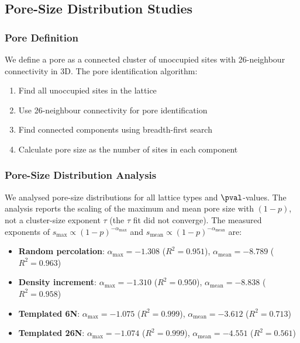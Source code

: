 \subsection{Pore-Size Distribution Studies}

\subsubsection{Pore Definition}
We define a pore as a connected cluster of unoccupied sites with 26-neighbour connectivity in 3D. The pore identification algorithm:

\begin{enumerate}
    \item Find all unoccupied sites in the lattice
    \item Use 26-neighbour connectivity for pore identification
    \item Find connected components using breadth-first search
    \item Calculate pore size as the number of sites in each component
\end{enumerate}

\subsubsection{Pore-Size Distribution Analysis}
We analysed pore-size distributions for all lattice types and $\pval$-values. The analysis reports the scaling of the maximum and mean pore size with $(1-p)$, not a cluster-size exponent $\tau$ (the $\tau$ fit did not converge). The measured exponents of $s_{\max} \propto (1-p)^{-\alpha_{\max}}$ and $s_{\mathrm{mean}} \propto (1-p)^{-\alpha_{\mathrm{mean}}}$ are:

\begin{itemize}
    \item \textbf{Random percolation}: $\alpha_{\max} = -1.308$ ($R^2 = 0.951$), $\alpha_{\mathrm{mean}} = -8.789$ ($R^2 = 0.963$)
    \item \textbf{Density increment}: $\alpha_{\max} = -1.310$ ($R^2 = 0.950$), $\alpha_{\mathrm{mean}} = -8.838$ ($R^2 = 0.958$)
    \item \textbf{Templated 6N}: $\alpha_{\max} = -1.075$ ($R^2 = 0.999$), $\alpha_{\mathrm{mean}} = -3.612$ ($R^2 = 0.713$)
    \item \textbf{Templated 26N}: $\alpha_{\max} = -1.074$ ($R^2 = 0.999$), $\alpha_{\mathrm{mean}} = -4.551$ ($R^2 = 0.561$)
\end{itemize}

